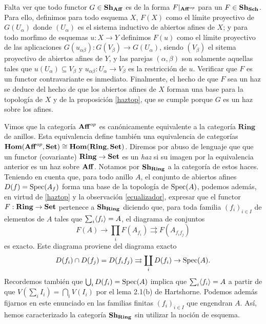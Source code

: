 \documentclass[twoside]{article}
\begin{document}
 Falta ver que todo functor $G\in\mathrm{\mathbf{Sh}}_{\mathrm{\mathbf{Aff}}}$ es de la forma $F|_{\mathrm{\mathbf{Aff}}^{op}}$ para un $F\in \mathrm{\mathbf{Sh}}_{\mathrm{\mathbf{Sch}}}$. Para ello, definimos para todo esquema $X$, $F(X)$ como el límite proyectivo de $G(U_\alpha)$ donde $(U_\alpha)$ es el sistema inductivo de abiertos afines de $X$; y para todo morfimo de esquemas $u:X\to Y$ definimos $F(u)$ como el límite proyectivo de las aplicaciones $G(u_{\alpha\beta}):G(V_\beta)\to G(U_\alpha)$, siendo $(V_\beta)$ el sitema proyectivo de abiertos afines de $Y$, y las parejas $(\alpha,\beta)$ son solamente aquellas tales que $u(U_\alpha)\subseteq V_\beta$ y $u_{\alpha\beta}:U_\alpha\to V_\beta$ es la restricción de $u$. Verificar que $F$ es un functor contravariante es inmediato. Finalmente, el hecho de que $F$ sea un haz se deduce del hecho de que los abiertos afines de $X$ forman una base para la topología de $X$ y de la proposición \ref{haztop}, que se cumple porque $G$ es un haz sobre los afines.%
 
 
 Vimos que la categoría $\mathrm{\mathbf{Aff}}^{op}$ es canónicamente equivalente a la categoría $\mathrm{\mathbf{Ring}}$ de anillos. Esta equivalencia define también una equivalencia de categorías $\mathrm{\mathbf{Hom}}(\mathrm{\mathbf{Aff}}^{op},\mathrm{\mathbf{Set}})\cong \mathrm{\mathbf{Hom}}(\mathrm{\mathbf{Ring}},\mathrm{\mathbf{Set}})$. Diremos por abuso de lenguaje que que un functor (covariante) $\mathrm{\mathbf{Ring}}\to\mathrm{\mathbf{Set}}$ es un \emph{haz} si su imagen por la equivalencia anterior es un haz sobre $\mathrm{\mathbf{Aff}}$. Notamos por $\mathrm{\mathbf{Sh}}_{\mathrm{\mathbf{Ring}}}$ a la categoría de estos haces. Teniendo en cuenta que, para todo anillo $A$, el conjunto de abiertos afines $D(f)=\operatorname{Spec}(A_f)$ forma una base de la topología de $\operatorname{Spec}(A)$, podemos además, en virtud de \ref{haztop} y la observación \ref{ecualizador}, expresar que el functor $F:\mathrm{\mathbf{Ring}}\to\mathrm{\mathbf{Set}}$ pertenece a $\mathrm{\mathbf{Sh}}_{\mathrm{\mathbf{Ring}}}$ diciendo que, para toda familia $(f_i)_{i\in I}$ de elementos de $A$ tales que $\sum_i \langle{f_i}\rangle=A$, el diagrama de conjuntos
 \[F(A)\to\prod_i F(A_{f_i})\rightrightarrows F(A_{f_if_j})\]
es exacto. Este diagrama proviene del diagrama exacto
\[
D(f_i)\cap D(f_j)=D(f_if_j)\rightrightarrows \coprod_i D(f_i)\to \operatorname{Spec}(A).
\] 
Recordemos también que $\bigcup_i D(f_i)=\operatorname{Spec}(A)$ implica que $\sum_i\langle{f_i}\rangle=A$ a partir de que $V(\sum_i I_i)=\bigcap_i V(I_i)$ por el lema 2.1(b) de Hartshorne. Podemos además fijarnos en este enunciado en las familias finitas $(f_i)_{i\in I}$ que engendran $A$. %
Así, hemos caracterizado la categoría $\mathrm{\mathbf{Sh}}_{\mathrm{\mathbf{Ring}}}$ sin utilizar la noción de esquema. 
\end{document}

